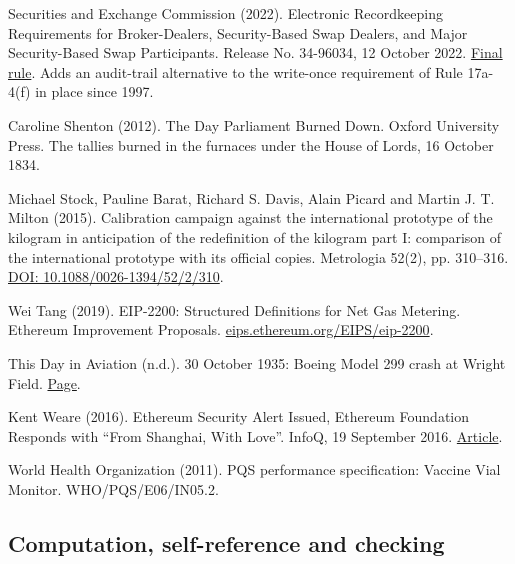 \documentclass[11pt,twoside]{article}
\theoremstyle{thielethm}
\theoremstyle{thieledef}
\theoremstyle{thieledef}
\theoremstyle{thieledef}
\theoremstyle{thielethm}
\theoremstyle{thieleobs}
\theoremstyle{thielethm}
\begin{document}
\noindent Securities and Exchange Commission (2022). Electronic Recordkeeping Requirements for Broker-Dealers, Security-Based Swap Dealers, and Major Security-Based Swap Participants. Release No. 34-96034, 12 October 2022. \href{https://www.sec.gov/rules/final/2022/34-96034.pdf}{Final rule}. Adds an audit-trail alternative to the write-once requirement of Rule 17a-4(f) in place since 1997.
\par\medskip

\noindent Caroline Shenton (2012). The Day Parliament Burned Down. Oxford University Press. The tallies burned in the furnaces under the House of Lords, 16 October 1834.
\par\medskip

\noindent Michael Stock, Pauline Barat, Richard S. Davis, Alain Picard and Martin J. T. Milton (2015). Calibration campaign against the international prototype of the kilogram in anticipation of the redefinition of the kilogram part I: comparison of the international prototype with its official copies. Metrologia 52(2), pp. 310--316. \href{https://doi.org/10.1088/0026-1394/52/2/310}{DOI: 10.1088/0026-1394/52/2/310}.
\par\medskip

\noindent Wei Tang (2019). EIP-2200: Structured Definitions for Net Gas Metering. Ethereum Improvement Proposals. \href{https://eips.ethereum.org/EIPS/eip-2200}{eips.ethereum.org/EIPS/eip-2200}.
\par\medskip

\noindent This Day in Aviation (n.d.). 30 October 1935: Boeing Model 299 crash at Wright Field. \href{https://www.thisdayinaviation.com/30-october-1935/}{Page}.
\par\medskip

\noindent Kent Weare (2016). Ethereum Security Alert Issued, Ethereum Foundation Responds with ``From Shanghai, With Love''. InfoQ, 19 September 2016. \href{https://www.infoq.com/news/2016/09/Ethereum-DOS-Attack}{Article}.
\par\medskip

\noindent World Health Organization (2011). PQS performance specification: Vaccine Vial Monitor. WHO/PQS/E06/IN05.2.
\par\medskip

\subsection{Computation, self-reference and checking}
\end{document}
